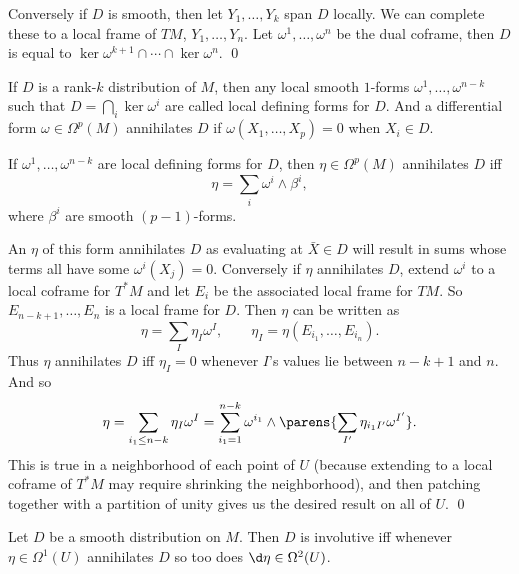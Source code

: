     Conversely if $D$ is smooth, then let $Y_1,\dots,Y_k$ span $D$ locally.
    We can complete these to a local frame of $TM$, $Y_1,\dots,Y_n$.
    Let $\omega^1,\dots,\omega^n$ be the dual coframe, then $D$ is equal to $\ker\omega^{k+1}\cap\cdots\cap\ker\omega^n$.
    \qed

\eproof

\bdefn

    If $D$ is a rank-$k$ distribution of $M$, then any local smooth $1$-forms $\omega^1,\dots,\omega^{n-k}$ such that $D=\bigcap_i\ker\omega^i$ are called
    {\emphcolor local defining forms} for $D$.
    And a differential form $\omega\in\Omega^p(M)$ {\emphcolor annihilates} $D$ if $\omega(X_1,\dots,X_p)=0$ when $X_i\in D$.

\edefn

\bprop

    If $\omega^1,\dots,\omega^{n-k}$ are local defining forms for $D$, then $\eta\in\Omega^p(M)$ annihilates $D$ iff
    $$ \eta = \sum_i \omega^i\wedge\beta^i , $$
    where $\beta^i$ are smooth $(p-1)$-forms.

\eprop

\bproof

    An $\eta$ of this form annihilates $D$ as evaluating at $\bar X\in D$ will result in sums whose terms all have some $\omega^i(X_j)=0$.
    Conversely if $\eta$ annihilates $D$, extend $\omega^i$ to a local coframe for $T^*M$ and let $E_i$ be the associated local frame for $TM$.
    So $E_{n-k+1},\dots,E_n$ is a local frame for $D$.
    Then $\eta$ can be written as
    $$ \eta = \sum_I \eta_I\omega^I,\qquad \eta_I = \eta(E_{i_1},\dots,E_{i_n}) . $$
    Thus $\eta$ annihilates $D$ iff $\eta_I=0$ whenever $I$'s values lie between $n-k+1$ and $n$.
    And so
    $$ \eta = \sum_{i_1\leq n-k}\eta_I\omega^I = \sum_{i_1=1}^{n-k}\omega^{i_1}\wedge\parens{\sum_{I'}\eta_{i_1I'}\omega^{I'}} . $$
    This is true in a neighborhood of each point of $U$ (because extending to a local coframe of $T^*M$ may require shrinking the neighborhood),
    and then patching together with a partition of unity gives us the desired result on all of $U$.
    \qed

\eproof

\bprop[name={involdisann}]

    Let $D$ be a smooth distribution on $M$.
    Then $D$ is involutive iff whenever $\eta\in\Omega^1(U)$ annihilates $D$ so too does $\d\eta\in\Omega^2(U)$.

\eprop

\bproof

